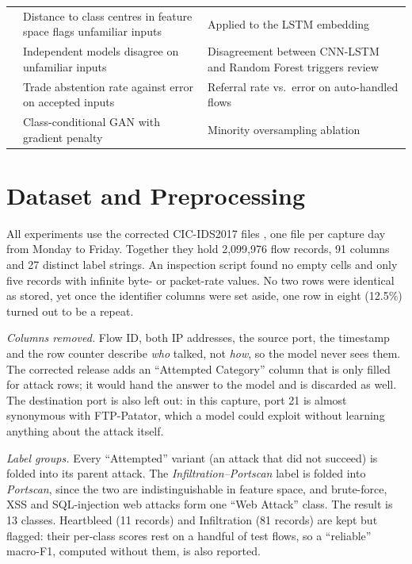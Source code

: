\documentclass[conference]{IEEEtran}
\begin{document}
\begin{table}[t]
\begin{tabular}{p{1.6cm}p{6.9cm}p{8.35cm}}
\cite{lee2018simple} & Distance to class centres in feature space flags unfamiliar inputs & Applied to the LSTM embedding \\
\cite{lakshminarayanan2017simple} & Independent models disagree on unfamiliar inputs & Disagreement between CNN-LSTM and Random Forest triggers review \\
\cite{geifman2017selective} & Trade abstention rate against error on accepted inputs & Referral rate vs.\ error on auto-handled flows \\
\cite{mirza2014conditional,gulrajani2017improved} & Class-conditional GAN with gradient penalty & Minority oversampling ablation \\
\bottomrule
\end{tabular}
\end{table}

\section{Dataset and Preprocessing}
All experiments use the corrected CIC-IDS2017 files \cite{engelen2021troubleshooting,liu2022error},
one file per capture day from Monday to Friday. Together they hold 2,099,976 flow records, 91
columns and 27 distinct label strings. An inspection script found no empty cells and only five
records with infinite byte- or packet-rate values. No two rows were identical as stored, yet once
the identifier columns were set aside, one row in eight (12.5\%) turned out to be a repeat.

\textit{Columns removed.} Flow ID, both IP addresses, the source port, the timestamp and the row
counter describe \emph{who} talked, not \emph{how}, so the model never sees them. The corrected
release adds an ``Attempted Category'' column that is only filled for attack rows; it would hand
the answer to the model and is discarded as well. The destination port is also left out: in this
capture, port 21 is almost synonymous with FTP-Patator, which a model could exploit without
learning anything about the attack itself.

\textit{Label groups.} Every ``Attempted'' variant (an attack that did not succeed) is folded into
its parent attack. The \textit{Infiltration--Portscan} label is folded into \textit{Portscan},
since the two are indistinguishable in feature space, and brute-force, XSS and SQL-injection web
attacks form one ``Web Attack'' class. The result is 13 classes. Heartbleed (11 records) and
Infiltration (81 records) are kept but flagged: their per-class scores rest on a handful of test
flows, so a ``reliable'' macro-F1, computed without them, is also reported.
\end{document}
